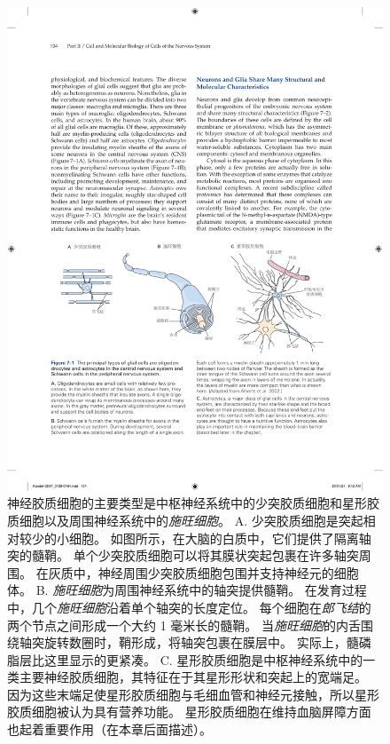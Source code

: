\begin{figure}[htbp]
	\centering
	\includegraphics[width=1.0\linewidth]{chap07/fig_7_1}
	\caption{神经胶质细胞的主要类型是中枢神经系统中的少突胶质细胞和星形胶质细胞以及周围神经系统中的\textit{施旺细胞}。
		A. 少突胶质细胞是突起相对较少的小细胞。
		如图所示，在大脑的白质中，它们提供了隔离轴突的髓鞘。
		单个少突胶质细胞可以将其膜状突起包裹在许多轴突周围。
		在灰质中，神经周围少突胶质细胞包围并支持神经元的细胞体。
		B. \textit{施旺细胞}为周围神经系统中的轴突提供髓鞘。
		在发育过程中，几个\textit{施旺细胞}沿着单个轴突的长度定位。
		每个细胞在\textit{郎飞结}的两个节点之间形成一个大约 1 毫米长的髓鞘。
		当\textit{施旺细胞}的内舌围绕轴突旋转数圈时，鞘形成，将轴突包裹在膜层中。
		实际上，髓磷脂层比这里显示的更紧凑。
		C. 星形胶质细胞是中枢神经系统中的一类主要神经胶质细胞，其特征在于其星形形状和突起上的宽端足。
		因为这些末端足使星形胶质细胞与毛细血管和神经元接触，所以星形胶质细胞被认为具有营养功能。
		星形胶质细胞在维持血脑屏障方面也起着重要作用（在本章后面描述）。}
	\label{fig:7_1}
\end{figure}


